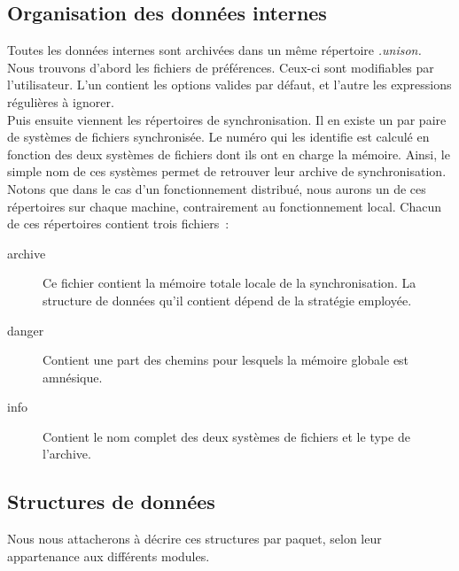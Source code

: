 \documentclass[11pt]{report}
\newcommand{\unison}{unison}
\begin{document}
{\subsection{Organisation des donn\'ees internes}
Toutes les donn\'ees internes sont archiv\'ees dans un m\^eme r\'epertoire
\emph{.\unison .}\\
Nous trouvons d'abord les fichiers de pr\'ef\'erences. Ceux-ci sont modifiables
par l'utilisateur. L'un contient les options valides par d\'efaut, et l'autre
les expressions r\'eguli\`eres \`a ignorer.\\
Puis ensuite viennent les r\'epertoires de synchronisation. Il en existe 
un par paire de syst\`emes de fichiers synchronis\'ee. Le num\'ero qui les 
identifie est calcul\'e en fonction des deux syst\`emes de fichiers dont ils 
ont en charge la m\'emoire. Ainsi, le simple nom de ces syst\`emes permet de 
retrouver leur archive de synchronisation.\\
Notons que dans le cas d'un fonctionnement distribu\'e, nous aurons un de
ces r\'epertoires sur chaque machine, contrairement au fonctionnement local.
Chacun de ces r\'epertoires contient trois fichiers~:\\
\begin{description}
\item [archive] Ce fichier contient la m\'emoire totale locale de la
  synchronisation. La structure de donn\'ees qu'il contient d\'epend de la
strat\'egie employ\'ee.
\item [danger] Contient une part des chemins pour lesquels la m\'emoire 
globale est amn\'esique.
\item [info] Contient le nom complet des deux syst\`emes de fichiers et le 
type de l'archive.
\end{description}
\subsection{Structures de donn\'ees}
Nous nous attacherons \`a d\'ecrire ces structures par paquet, selon 
leur appartenance aux diff\'erents modules.
}
\end{document}
